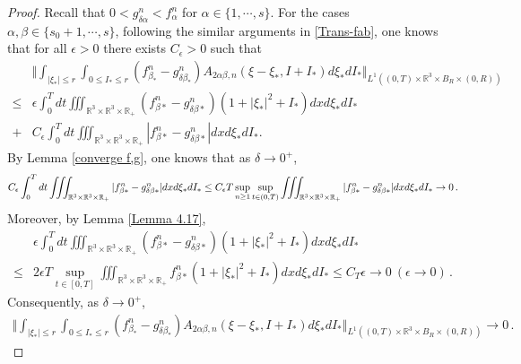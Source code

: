\documentclass[10pt,a4paper]{amsart}
\def\R{\mathbb{R}}
\begin{document}
\begin{proof}
Recall that $0 < g^n_{\delta \alpha} < f^n_\alpha$ for $\alpha \in \{ 1, \cdots, s \}$. For the cases $\alpha, \beta \in \{s_0+1,\cdots ,s\}$, following the similar arguments in \eqref{Trans-fab}, one knows that for all $\epsilon>0$ there exists $C_\epsilon >0$ such that
\begin{equation*}
	\begin{aligned}
		&\Vert \int_{|\xi_* |\leq r} \int_{0\leq I_* \leq r} (f^n_{ \beta_*} -g^n_{\delta \beta_*}) A_{2\alpha \beta ,n}(\xi -\xi_* ,I+I_* ) d\xi_* dI_* \Vert_{L^1((0,T)\times \R^3 \times B_R \times (0,R))} \\
		\leq & \epsilon \int_{0}^{T} dt \iiint_{\R^3 \times \R^3 \times \R_+} (f^n_{\beta *} -g^n_{\delta \beta * } ) (1+|\xi_*|^2+I_*) dx d\xi_* dI_* \\
		+&C_\epsilon  \int_{0}^{T} dt \iiint_{\R^3 \times \R^3 \times \R_+}| f^n_{\beta *} -g^n_{\delta \beta * } |dx d\xi_* dI_* .
	\end{aligned}
\end{equation*}
By Lemma \ref{converge f,g}, one knows that as $\delta \to 0^+$,
\begin{equation*}{\small
  \begin{aligned}
    C_\epsilon  \int_{0}^{T} dt \iiint_{\R^3 \times \R^3 \times \R_+}| f^n_{\beta *} -g^n_{\delta \beta * } |dx d\xi_* dI_* \leq C_\epsilon T \sup_{n \geq 1} \sup_{ t \in (0, T) } \iiint_{\R^3 \times \R^3 \times \R_+}| f^n_{\beta *} -g^n_{\delta \beta * } |dx d\xi_* dI_* \to 0 \,.
  \end{aligned}}
\end{equation*}
Moreover, by Lemma \ref{Lemma 4.17},
\begin{equation*}
  \begin{aligned}
    & \epsilon \int_{0}^{T} dt \iiint_{\R^3 \times \R^3 \times \R_+} (f^n_{\beta *} -g^n_{\delta \beta * } ) (1+|\xi_*|^2+I_*) dx d\xi_* dI_* \\
    \leq & 2 \epsilon T \sup_{ t \in [0, T] } \iiint_{\R^3 \times \R^3 \times \R_+} f^n_{\beta *} (1+|\xi_*|^2+I_*) dx d\xi_* dI_* \leq C_T \epsilon \to 0 \ (\epsilon \to 0) \,.
  \end{aligned}
\end{equation*}
Consequently, as $\delta \to 0^+$,
\begin{equation*}
  \begin{aligned}
    \Vert \int_{|\xi_* |\leq r} \int_{0\leq I_* \leq r} (f^n_{ \beta_*} -g^n_{\delta \beta_*}) A_{2\alpha \beta ,n}(\xi -\xi_* ,I+I_* ) d\xi_* dI_* \Vert_{L^1((0,T)\times \R^3 \times B_R \times (0,R))} \to 0 \,.

\end{aligned}
\end{equation*}
\end{proof}
\end{document}
